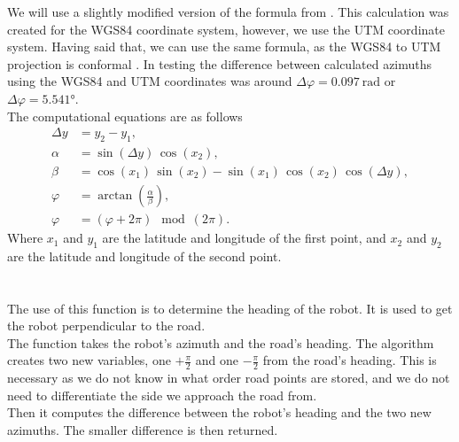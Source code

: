             We will use a slightly modified version of the formula from \cite{calc_bearing}. This calculation was created for the WGS84 coordinate system, however, we use the UTM coordinate system. Having said that, we can use the same formula, as the WGS84 to UTM projection is conformal \cite{Map_projections}. In testing the difference between calculated azimuths using the WGS84 and UTM coordinates was around $\Delta\varphi=0.097\:\si{\radian}$ or $\Delta\varphi=5.541\si{\degree}$.\\
            The computational equations are as follows
            \begin{align}
                \Delta y &= y_{2} - y_{1}, \\
                \alpha &= \sin{(\Delta y)}\,\cos{(x_{2})}, \\
                \beta &= \cos{(x_{1})}\,\sin{(x_{2})} - \sin{(x_{1})}\,\cos{(x_{2})}\,\cos{(\Delta y)}, \\
                \varphi &= \arctan{\left(\frac{\alpha}{\beta}\right)}, \\
                \varphi &= (\varphi + 2\pi) \mod (2\pi).
            \end{align}
            Where $x_{1}$ and $y_{1}$ are the latitude and longitude of the first point, and $x_{2}$ and $y_{2}$ are the latitude and longitude of the second point.\\\\
        \\
            The use of this function is to determine the heading of the robot. It is used to get the robot perpendicular to the road.\\
            The function takes the robot's azimuth and the road's heading. The algorithm creates two new variables, one $+\frac{\pi}{2}$ and one $-\frac{\pi}{2}$ from the road's heading. This is necessary as we do not know in what order road points are stored, and we do not need to differentiate the side we approach the road from.\\
            Then it computes the difference between the robot's heading and the two new azimuths. The smaller difference is then returned.
    

